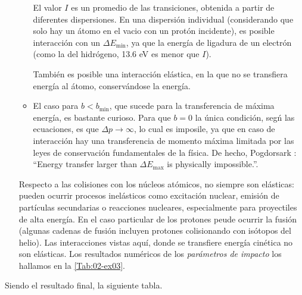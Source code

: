 \begin{enumerate}[label=\alph*)]
\begin{itemize}
        El valor $I$ es un promedio de las transiciones, obtenida a partir de diferentes dispersiones. En una dispersión individual (considerando que solo hay un átomo en el vacio con un protón incidente), es posible interacción con un $\Delta E_{\min}$, ya que la energía de ligadura de un electrón (como la del hidrógeno, 13.6 eV es menor que $I$). 
        
        También es posible una interacción elástica, en la que no se transfiera energía al átomo, conservándose la energía. 
        
        \item El caso para $b<b_{\min}$, que sucede para la transferencia de máxima energía, es bastante curioso. Para que $b=0$ la única condición, segń las ecuaciones, es que $\Delta p \to \infty$, lo cual es imposile, ya que en caso de interacción hay una transferencia de momento máxima limitada por las leyes de conservación fundamentales de la física. De hecho, Pogdorsark \cite{Podgorsak2022}: ``Energy transfer larger than $\Delta E_{\max}$ is physically impossible.''. 
    \end{itemize}
    
    Respecto a las colisiones con los núcleos atómicos, no siempre son elásticas: pueden ocurrir procesos inelásticos como excitación nuclear, emisión de partículas secundarias o reacciones nucleares, especialmente para proyectiles de alta energía. En el caso particular de los protones peude ocurrir la fusión (algunas cadenas de fusión incluyen protones colisionando con isótopos del helio). Las interacciones vistas aquí, donde se transfiere energía cinética no son elásticas. Los resultados numéricos de los \textit{parámetros de impacto} los hallamos en la \cref{Tab:02-ex03}.
\end{enumerate}
Siendo el resultado final, la siguiente tabla.

\begingroup
\makeatletter
\let\old@floatboxreset\@floatboxreset
\def\@floatboxreset{\old@floatboxreset\centering} %
\makeatother
\let\normalsize\scriptsize

\endgroup



